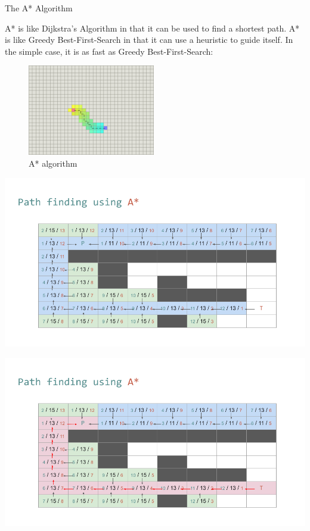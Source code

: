 \documentclass[ignorenonframetext,]{beamer}
\begin{document}
\begin{frame}{The A* Algorithm}
\protect\hypertarget{the-a-algorithm}{}

A* is like Dijkstra's Algorithm in that it can be used to find a
shortest path. A* is like Greedy Best-First-Search in that it can use a
heuristic to guide itself. In the simple case, it is as fast as Greedy
Best-First-Search:

\begin{figure}
\centering
\includegraphics[width=\textwidth,height=1.5625in]{a-star.png}
\caption{A* algorithm}
\end{figure}

\end{frame}

\begin{frame}{}
\protect\hypertarget{section}{}

\includegraphics{pathfinding-using-A-Star.png}

\end{frame}

\begin{frame}{}
\protect\hypertarget{section-1}{}

\includegraphics{pathfinding-using-A-Star-1.png}

\end{frame}
\end{document}
